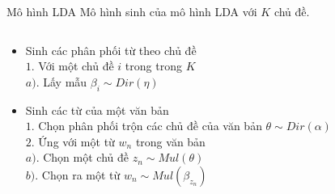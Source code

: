 \documentclass[pdf]{beamer}
\begin{document}
\begin{frame}{Mô hình LDA}
	Mô hình sinh của mô hình LDA với $K$ chủ đề.
	\begin{columns}[T] %
		\begin{column}{.55\textwidth}
			\begin{itemize}
				\item  Sinh các phân phối từ theo chủ đề \\
					$1.$ Với một chủ đề $i$ trong trong $K$ \\
				\space $a).$ Lấy mẫu $\beta_i \sim Dir(\eta)$
				\item  Sinh các từ của một văn bản \\
				$1.$ Chọn phân phối trộn các chủ đề của văn bản $\theta \sim Dir(\alpha)$ \\
				$2.$ Ứng với một từ $w_n$ trong văn bản \\
					$a).$ Chọn một chủ đề $z_n \sim Mul(\theta)$ \\
					$b).$ Chọn ra một từ $ w_n \sim Mul(\beta_{z_n})$  \\
			\end{itemize}
		\end{column} %
		\hfill%
		\begin{column}{.43\textwidth}
			\begin{figure}
			\end{figure}				
		\end{column} %
	\end{columns}
\end{frame}
\end{document}
